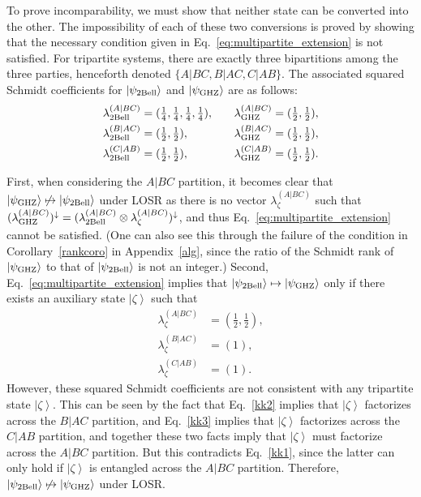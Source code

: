 \documentclass[12pt]{article}
\newcommand{\ket}[1]{\left| #1 \right>}
\theoremstyle{plain}
\theoremstyle{definition}
\begin{document}
\begin{appendices}
To prove incomparability, we must show that neither state can be converted into the other. The impossibility of each of these two conversions is proved by showing that the necessary condition given in Eq.~\eqref{eq:multipartite_extension} is not satisfied.
For tripartite systems, there are exactly three bipartitions among the three parties, henceforth denoted $\{A|BC, B|AC, C|AB\}$. The associated squared Schmidt coefficients for $\ket{\psi_{\rm 2Bell}}$ and $|\psi_{\rm GHZ}\rangle$ are as follows:
\begin{equation}
    \begin{alignedat}{3}
        \lambda^{(A|BC)}_{\rm 2Bell}
        &= (\tfrac{1}{4},\tfrac{1}{4},\tfrac{1}{4},\tfrac{1}{4}),
        \qquad 
        &&\lambda^{(A|BC)}_{\rm GHZ}
        &&= (\tfrac{1}{2},\tfrac{1}{2}),\\
        \lambda^{(B|AC)}_{\rm 2Bell}
        &= (\tfrac{1}{2},\tfrac{1}{2}),
        &&\lambda^{(B|AC)}_{\rm GHZ}
        &&= (\tfrac{1}{2},\tfrac{1}{2}),\\
        \lambda^{(C|AB)}_{\rm 2Bell}
        &= (\tfrac{1}{2},\tfrac{1}{2}),
        &&\lambda^{(C|AB)}_{\rm GHZ}
        &&= (\tfrac{1}{2},\tfrac{1}{2}).
    \end{alignedat}
\end{equation}

First, when considering the $A|BC$ partition, it becomes clear that $|\psi_{\rm GHZ}\rangle \not \mapsto |\psi_{\rm 2Bell}\rangle$ under LOSR as there is no vector $\lambda^{(A|BC)}_{\zeta}$ such that $(\lambda^{(A|BC)}_{\rm GHZ})^{\downarrow} = (\lambda^{(A|BC)}_{\rm 2Bell}\otimes \lambda^{(A|BC)}_{\zeta})^{\downarrow}$, and thus Eq.~\eqref{eq:multipartite_extension} cannot be satisfied. (One can also see this through the failure of the condition in Corollary~\ref{rankcoro} in Appendix~\ref{alg}, since the ratio of the Schmidt rank of $|\psi_{\rm GHZ}\rangle$ to that of $|\psi_{\rm 2Bell}\rangle$
 is not an integer.)
Second, Eq.~\eqref{eq:multipartite_extension} implies that $|\psi_{\rm 2Bell}\rangle \mapsto |\psi_{\rm GHZ}\rangle$ only if there exists an auxiliary state $\ket{\zeta}$ such that
\begin{align}
    \lambda^{(A|BC)}_{\zeta} &= (\tfrac{1}{2},\tfrac{1}{2}),\label{kk1}\\
    \lambda^{(B|AC)}_{\zeta} &= (1),\label{kk2}\\
    \lambda^{(C|AB)}_{\zeta} &= (1).\label{kk3}
\end{align}
However, these squared Schmidt coefficients are not consistent with any tripartite state $\ket \zeta$. This can be seen by the fact that Eq.~\eqref{kk2} implies that $\ket \zeta$ factorizes across the $B|AC$ partition, and Eq.~\eqref{kk3} implies that $\ket \zeta$ factorizes across the $C|AB$ partition, and together these two facts imply that $\ket \zeta$ must factorize across the $A|BC$ partition. But this contradicts Eq.~\eqref{kk1}, since the latter can only hold if $\ket \zeta$ is entangled
  across the $A|BC$ partition. Therefore, $|\psi_{\rm 2Bell}\rangle \not \mapsto |\psi_{\rm GHZ}\rangle$ under LOSR.


\end{appendices}
\end{document}
